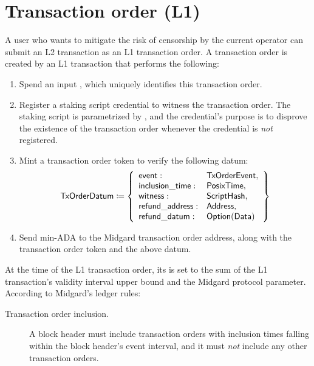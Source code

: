 \documentclass[../midgard.tex]{subfiles}
\begin{document}
\section{Transaction order (L1)}
\label{h:transaction-order}

A user who wants to mitigate the risk of censorship by the current operator can submit an L2 transaction as an L1 transaction order.
A transaction order is created by an L1 transaction that performs the following:
\begin{enumerate}
    \item Spend an input , which uniquely identifies this transaction order.
    \item Register a staking script credential to witness the transaction order.
      The staking script is parametrized by , and the credential's purpose is to disprove the existence of the transaction order whenever the credential is \emph{not} registered.
    \item Mint a transaction order token to verify the following datum:
        \begin{equation*}
        \mathsf{TxOrderDatum} \coloneq \left\{
            \begin{array}{ll}
                \mathsf{event} : & \mathsf{TxOrderEvent}, \\
                \mathsf{inclusion\_time} : & \mathsf{PosixTime}, \\
                \mathsf{witness} : & \mathsf{ScriptHash}, \\
                \mathsf{refund\_address}: & \mathsf{Address}, \\
                \mathsf{refund\_datum}: & \mathsf{Option(Data)}
            \end{array}
            \right\}
        \end{equation*}
    \item Send min-ADA to the Midgard transaction order address, along with the transaction order token and the above datum.
\end{enumerate}

At the time of the L1 transaction order, its  is set to the sum of the L1 transaction's validity interval upper bound and the  Midgard protocol parameter.
According to Midgard's ledger rules:
\begin{description}
    \item[Transaction order inclusion.] A block header must include transaction orders with inclusion times falling within the block header's event interval, and it must \emph{not} include any other transaction orders.
\end{description}
\end{document}
